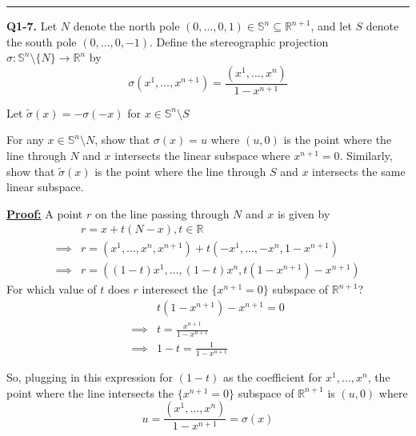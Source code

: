\documentclass{article}
\newcommand{\R}{\mathbb{R}}
\begin{document}
\vskip 0.5cm
\hrule 
\vskip 0.5cm

\textbf{Q1-7.} Let $N$ denote the north pole $(0, \dots, 0, 1) \in \mathbb{S}^n \subseteq \R^{n+1}$, and let $S$ denote the south pole $(0, \dots, 0, -1)$. Define the stereographic projection $\sigma : \mathbb{S}^n \setminus \{N\} \rightarrow \R^n$ by
\[ \sigma(x^1, \dots, x^{n+1}) = \frac{(x^1, \dots, x^{n})}{1 - x^{n+1}} \]

Let $\tilde{\sigma}(x) = -\sigma(-x)$ for $x \in \mathbb{S}^n \setminus S$

\vskip 0.5cm

\begin{enumerate}[label=(\alph*)]
  \begin{dottedbox}
    \item For any $x \in \mathbb{S}^n \setminus N$, show that $\sigma(x) = u$ where $(u, 0)$ is the point where the line through $N$ and $x$ intersects the linear subspace where $x^{n+1} = 0$. Similarly, show that $\tilde{\sigma}(x)$ is the point where the line through $S$ and $x$ intersects the same linear subspace.
  \end{dottedbox}
  
  \vskip 0.5cm
  \underline{\textbf{Proof:}} A point $r$ on the line passing through $N$ and $x$ is given by 
  \begin{align*}
    &r = x + t(N - x), t \in \R \\
    \implies &r = (x^1, \dots, x^n, x^{n+1}) + t(-x^1, \dots, -x^n, 1-x^{n+1}) \\
    \implies &r = \left( (1-t)x^1, \dots, (1-t)x^n, t(1-x^{n+1}) - x^{n+1} \right)
  \end{align*}
  For which value of $t$ does $r$ interesect the $\{x^{n+1} = 0\}$ subspace of $\R^{n+1}$? 
  \begin{align*}
    &t(1-x^{n+1})-x^{n+1} = 0 \\
    \implies& \boxed{t = \frac{x^{n+1}}{1-x^{n+1}}} \\
    \implies& \boxed{1 - t = \frac{1}{1 - x^{n+1}}}
  \end{align*}

  So, plugging in this expression for $(1-t)$ as the coefficient for $x^1, \dots, x^n$, the point where the line intersects the $\{x^{n+1} = 0\}$ subspace of $\R^{n+1}$ is $(u, 0)$ where 
  \[ u = \frac{(x^1, \dots, x^n)}{1 - x^{n+1}} = \sigma(x) \]


\end{enumerate}
\end{document}
